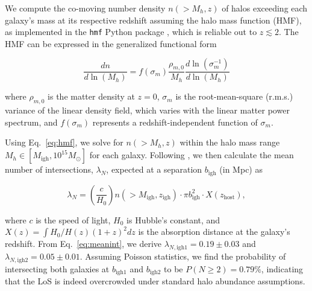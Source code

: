 \documentclass[twocolumn, linenumbers, tra]{aastex631}
\newcommand{\rev}[1]{{\color{purple}#1}}
\begin{document}
\rev{We compute the co-moving number density $n\left(>M_h, z\right)$ of halos exceeding each galaxy's mass at its respective redshift assuming the \citet{Tinker2008} halo mass function (HMF), as implemented in the \texttt{hmf} Python package \citep{Murray2013}, which is reliable out to $z \lesssim 2$. The HMF can be expressed in the generalized functional form 

\begin{equation}\label{eq:hmf}
  \frac{d n}{d \ln (M_{h})} = f\left(\sigma_m\right) \frac{\rho_{m, 0}}{M_{h}} \frac{d \ln \left(\sigma_m^{-1}\right)}{d \ln (M_{h})}
\end{equation}

\noindent
where $\rho_{m, 0}$ is the matter density at $z=0$, $\sigma_m$ is the root-mean-square (r.m.s.) variance of the linear density field, which varies with the linear matter power spectrum, and $f\left(\sigma_m\right)$ represents a redshift-independent function of $\sigma_m$.

Using Eq.~\ref{eq:hmf}, we solve for $n(>M_h, z)$ within the halo mass range $M_h \in [M_{\mathrm{igh}}, 10^{15} M_{\odot}]$ for each galaxy. Following \citet{Prochaska2019b}, we then calculate the mean number of intersections, $\lambda_{N}$, expected at a separation $b_{\mathrm{igh}}$ (in Mpc) as

\begin{equation} \label{eq:meanint}
\lambda_{N} = \left( \frac{c}{H_0} \right) n(>M_\mathrm{igh}, z_{\mathrm{igh}}) \cdot \pi b_{\mathrm{igh}}^2 \cdot X(z_{\mathrm{host}}),
\end{equation}

\noindent
where $c$ is the speed of light, $H_0$ is Hubble's constant, and $X(z) = \int H_0/H(z)(1+z)^2 d z$ is the absorption distance at the galaxy's redshift. From Eq.~\ref{eq:meanint}, we derive $\lambda_{N,\mathrm{igh1}}=0.19 \pm 0.03$ and $\lambda_{N,\mathrm{igh2}}=0.05 \pm 0.01$. Assuming Poisson statistics, we find the probability of intersecting both galaxies at $b_{\mathrm{igh1}}$ and $b_{\mathrm{igh2}}$ to be $P(N\geq2) = 0.79\%$, indicating that the LoS is indeed overcrowded under standard halo abundance assumptions.}
\end{document}
